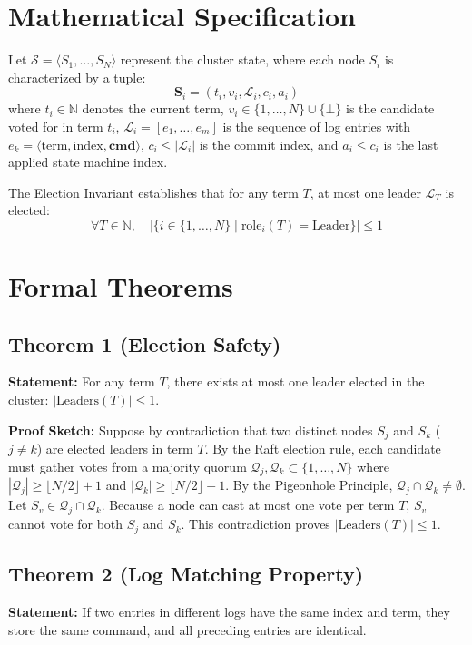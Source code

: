 \documentclass[10pt,journal,compsoc]{IEEEtran}
\begin{document}
\section{Mathematical Specification}
Let $\mathcal{S} = \langle S_1, \dots, S_N \rangle$ represent the cluster state, where each node $S_i$ is characterized by a tuple:
$$\mathbf{S}_i = \left( t_i, v_i, \mathcal{L}_i, c_i, a_i \right)$$
where $t_i \in \mathbb{N}$ denotes the current term, $v_i \in \{1, \dots, N\} \cup \{\bot\}$ is the candidate voted for in term $t_i$, $\mathcal{L}_i = [e_1, \dots, e_m]$ is the sequence of log entries with $e_k = \langle \text{term}, \text{index}, \mathbf{cmd} \rangle$, $c_i \le |\mathcal{L}_i|$ is the commit index, and $a_i \le c_i$ is the last applied state machine index.

The Election Invariant establishes that for any term $T$, at most one leader $\mathcal{L}_T$ is elected:
$$\forall T \in \mathbb{N}, \quad |\{ i \in \{1, \dots, N\} \mid \text{role}_i(T) = \text{Leader} \}| \le 1$$

\section{Formal Theorems}
\subsection{Theorem 1 (Election Safety)}
\textbf{Statement:} For any term $T$, there exists at most one leader elected in the cluster: $|\text{Leaders}(T)| \le 1$.

\textbf{Proof Sketch:} Suppose by contradiction that two distinct nodes $S_j$ and $S_k$ ($j \ne k$) are elected leaders in term $T$. By the Raft election rule, each candidate must gather votes from a majority quorum $\mathcal{Q}_j, \mathcal{Q}_k \subset \{1, \dots, N\}$ where $|\mathcal{Q}_j| \ge \lfloor N/2 \rfloor + 1$ and $|\mathcal{Q}_k| \ge \lfloor N/2 \rfloor + 1$. By the Pigeonhole Principle, $\mathcal{Q}_j \cap \mathcal{Q}_k \ne \emptyset$. Let $S_v \in \mathcal{Q}_j \cap \mathcal{Q}_k$. Because a node can cast at most one vote per term $T$, $S_v$ cannot vote for both $S_j$ and $S_k$. This contradiction proves $|\text{Leaders}(T)| \le 1$.

\subsection{Theorem 2 (Log Matching Property)}
\textbf{Statement:} If two entries in different logs have the same index and term, they store the same command, and all preceding entries are identical.
\end{document}
